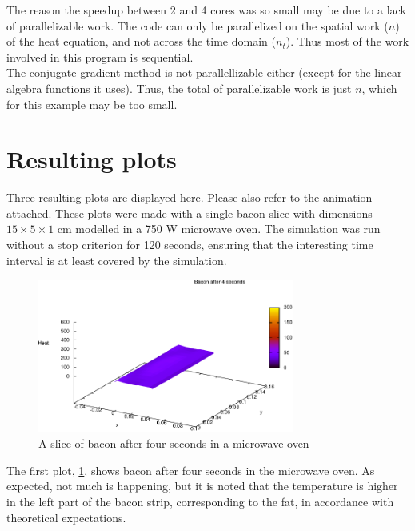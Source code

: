 The reason the speedup between 2 and 4 cores was so small may be due to a lack of
parallelizable work. The code can only be parallelized on the spatial work ($n$) of the
heat equation, and not across the time domain ($n_t$). Thus most of the work involved in
this program is sequential. \\

The conjugate gradient method is not parallellizable either (except for the linear algebra functions it
uses). Thus, the total of parallelizable work is just $n$, which for this example may be too small.

\section{Resulting plots}
Three resulting plots are displayed here. Please also refer to the animation
attached. These plots were made with a single bacon slice with
dimensions $15\times5\times1$ cm modelled in a 750 W microwave oven. The
simulation was run without a stop criterion for 120 seconds, ensuring that the
interesting time interval is at least covered by the simulation. \\


\begin{figure}[!h]
  \begin{center}
    \includegraphics[width=0.75\textwidth]{bacon-4sec.pdf}
  \end{center}
  \caption{A slice of bacon after four seconds in a microwave oven}
  \label{fig:bacon-4sec}
\end{figure}

The first plot, \cref{fig:bacon-4sec}, shows bacon after four seconds in the microwave oven. As
expected, not much is happening, but it is noted that the temperature is higher
in the left part of the bacon strip, corresponding to the fat, in accordance
with theoretical expectations.\\

